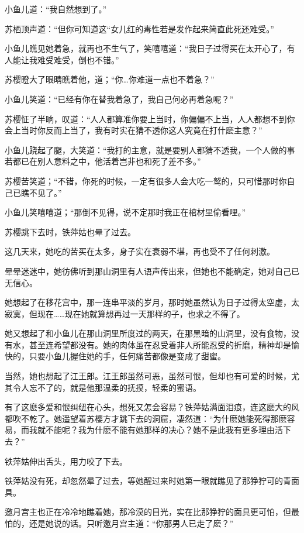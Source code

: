 \documentclass[12pt,oneside]{book}
\begin{document}
小鱼儿道：``我自然想到了。''

苏栖顶声道：``但你可知道这``女儿红的毒性若是发作起来简直此死还难受。''

小鱼儿瞧见她着急，就再也不生气了，笑嘻嘻道：``我日子过得买在太开心了，有人能让我难受难受，倒也不错。''

苏樱瞪大了眼睛瞧着他，道；``你\ldots 你难道一点也不着急？''

小鱼儿笑道：``已经有你在替我着急了，我自己何必再着急呢？''

苏樱怔了半晌，叹道：``人人都算准你要上当时，你偏偏不上当，人人都想不到你会上当时你反而上当了，我有时实在猜不透你这人究竟在打什麽主意？''

小鱼儿跷起了腿，大笑道：``我打的主意，就是要别人都猜不透我，一个人做的事若都已在别人意料之中，他活着岂非也和死了差不多。''

苏樱苦笑道；``不错，你死的时候，一定有很多人会大吃一鹫的，只可惜那时你自己已瞧不见了。''

小鱼儿笑嘻嘻道；``那倒不见得，说不定那时我正在棺材里偷看哩。''

苏樱跳下去时，铁萍姑也晕了过去。

这几天来，她吃的苦买在太多，身子实在衰弱不堪，再也受不了任何刺激。

晕晕迷迷中，她彷佛听到那山洞里有人语声传出来，但她也不能确定，她对自己已无信心。

她想起了在移花宫中，那一连串平淡的岁月，那时她虽然认为日子过得太空虚，太寂寞，但现在\ldots\ldots 现在她就算想再过一天那样的子，也求之不得了。

她又想起了和小鱼儿在那山洞里所度过的两天，在那黑暗的山洞里，没有食物，没有水，甚至连希望都没有。她的肉体虽在忍受着非人所能忍受的折磨，精神却是愉快的，只要小鱼儿握住她的手，任何痛苦都像是变成了甜蜜。

当然，她也想起了江王郎。江王郎虽然可恶，虽然可恨，但却也有可爱的时候，尤其令人忘不了的，就是他那温柔的抚摸，轻柔的蜜语。

有了这麽多爱和恨纠纽在心头，想死又怎会容易？铁萍姑满面泪痕，连这麽大的风都吹不乾了。她遥望着苏樱方才跳下去的洞窟，凄然道：``为什麽她能死得那麽容易，而我就不能呢？我为什麽不能有她那样的决心？她不是此我有更多理由活下去？''

铁萍姑伸出舌头，用力咬了下去。

铁萍姑没有死，却忽然晕了过去，等她醒过来时她第一眼就瞧见了那狰狞可的青面具。

邀月宫主也正在冷冷地瞧着她，那冷漠的目光，实在比那狰狞的面具更可怕，但最怕的，还是她说的话。只听邀月宫主道：``你那男人已走了麽？''
\end{document}
